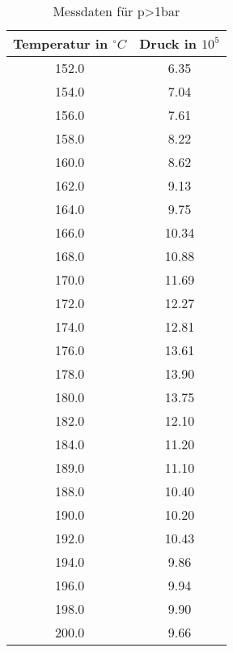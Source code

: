 \documentclass[
  captions=tableheading,
]{scrartcl}
\begin{document}
 \begin{table}
   \centering
   
   \caption{Messdaten für p>1bar}

   \label{tab:Messdaten2}

 \begin{tabular}{c c}
   \toprule
   {Temperatur in $^\circ C$}& {Druck in $10^5$}\\
 \midrule
 152.0 & 6.35 \\
 154.0 & 7.04 \\
 156.0 & 7.61 \\
 158.0 & 8.22 \\
 160.0 & 8.62 \\
 162.0 & 9.13 \\
 164.0 & 9.75 \\
 166.0 & 10.34 \\
 168.0 & 10.88\\
 170.0 & 11.69\\
 172.0 & 12.27\\
 174.0& 12.81 \\
 176.0& 13.61 \\
 178.0& 13.90 \\
 180.0&  13.75\\
 182.0&  12.10\\
 184.0&  11.20\\
 189.0&  11.10\\
 188.0&  10.40\\
 190.0 & 10.20\\
 192.0 & 10.43\\
 194.0 & 9.86\\
 196.0 & 9.94\\
 198.0 & 9.90\\
 200.0 & 9.66\\
\end{tabular}
\end{table}
\end{document}

